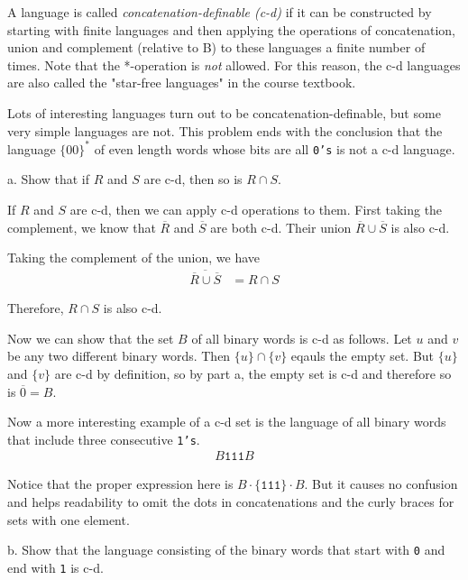 \documentclass[12pt]{article}
\begin{document}
\par{A language is called \emph{concatenation-definable (c-d)} if it can be constructed by starting with finite languages and then applying the operations of concatenation, union and complement (relative to B) to these languages a finite number of times. Note that the *-operation is \emph{not} allowed. For this reason, the c-d languages are also called the "star-free languages" in the course textbook.}
\par{Lots of interesting languages turn out to be concatenation-definable, but some very simple languages are not. This problem ends with the conclusion that the language $\{00\}^*$ of even length words whose bits are all \texttt{0's} is not a c-d language.}
\newline
\par{a. Show that if $R$ and $S$ are c-d, then so is $R \cap S$.}
\par{If $R$ and $S$ are c-d, then we can apply c-d operations to them. First taking the complement, we know that $\overline{R}$ and $\overline{S}$ are both c-d. Their union $\overline{R} \cup \overline{S}$ is also c-d.}
\par{Taking the complement of the union, we have}
\begin{align*}
\overline{\overline{R} \cup \overline{S}} &= R \cap S
\end{align*}
\par{Therefore, $R \cap S$ is also c-d.}
\newline
\par{Now we can show that the set $B$ of all binary words is c-d as follows. Let $u$ and $v$ be any two different binary words. Then $\{u\} \cap \{v\}$ eqauls the empty set. But $\{u\}$ and $\{v\}$ are c-d by definition, so by part a, the empty set is c-d and therefore so is $\overline{0} = B$.}
\par{Now a more interesting example of a c-d set is the language of all binary words that include three consecutive \texttt{1's}.}
\begin{align*}
B\texttt{111}B
\end{align*}
\par{Notice that the proper expression here is $B \cdot \{\texttt{111}\} \cdot B$. But it causes no confusion and helps readability to omit the dots in concatenations and the curly braces for sets with one element.}
\newline
\par{b. Show that the language consisting of the binary words that start with \texttt{0} and end with \texttt{1} is c-d.}
\end{document}
